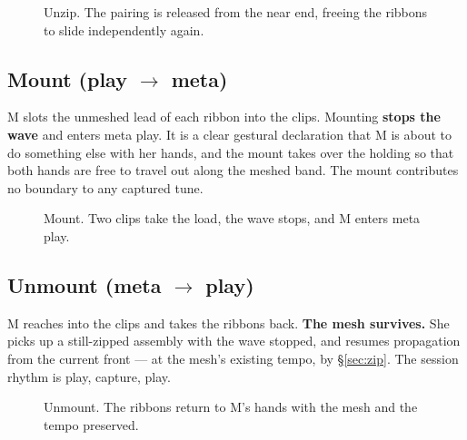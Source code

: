 \documentclass[11pt,a4paper]{article}
\theoremstyle{definition}
\theoremstyle{plain}
\theoremstyle{remark}
\newcommand{\spools}{%
  \fill[ribL,opacity=.45,rounded corners=2pt] (1.55,5.40) rectangle (2.45,5.95);
  \fill[ribR,opacity=.45,rounded corners=2pt] (5.55,5.40) rectangle (6.45,5.95);
  \node[font=\scriptsize] at (2,6.22) {left spool};
  \node[font=\scriptsize] at (6,6.22) {right spool};
}
\newcommand{\musician}{%
  \draw[gray] (4,-0.10) circle (0.23);
  \node[font=\scriptsize] at (4,-0.10) {M};
}
\newcommand{\axes}{%
  \draw[->,gray,thin] (0.85,4.30) -- (1.45,4.30) node[right,font=\scriptsize]{$x$};
  \draw[->,gray,thin] (0.85,4.30) -- (0.85,4.90) node[above,font=\scriptsize]{$z$};
}
\newcommand{\ribbonszipped}{%
  \draw[ribL,opacity=.45,line width=16pt,line join=round]
    (2,5.40) -- (2,4.60) -- (3.72,4.20) -- (3.72,2.20) -- (3.10,1.70) -- (3.10,0.70);
  \draw[ribR,opacity=.45,line width=16pt,line join=round]
    (6,5.40) -- (6,4.60) -- (4.28,4.20) -- (4.28,2.20) -- (4.90,1.70) -- (4.90,0.70);
}
\newcommand{\mesh}[2]{%
  \draw[gray!75,decorate,decoration={zigzag,segment length=5pt,amplitude=3pt}]
    (4,#1) -- (4,#2);
}
\newcommand{\mountclips}{%
  \fill[amb,opacity=.75,rounded corners=1pt] (3.76,1.05) rectangle (3.92,1.45);
  \fill[amb,opacity=.75,rounded corners=1pt] (4.08,1.05) rectangle (4.24,1.45);
}
\newcommand{\handat}[2]{\filldraw[fill=white,draw=gray!80,thin] (#1,#2) circle (0.17);}
\newcommand{\handsdefault}{\handat{3.10}{0.55}\handat{4.90}{0.55}}
\begin{document}
\begin{figure}[H]\centering
{}
\caption{Unzip. The pairing is released from the near end, freeing the ribbons to slide
independently again.}
\end{figure}

\subsection{Mount \normalfont(play $\to$ meta)}

M slots the unmeshed lead of each ribbon into the clips. Mounting \textbf{stops the wave} and
enters meta play. It is a clear gestural declaration that M is about to do something else with her
hands, and the mount takes over the holding so that both hands are free to travel out along the
meshed band. The mount contributes no boundary to any captured tune.

\begin{figure}[H]\centering
{}
\caption{Mount. Two clips take the load, the wave stops, and M enters meta play.}
\end{figure}

\subsection{Unmount \normalfont(meta $\to$ play)}

M reaches into the clips and takes the ribbons back. \textbf{The mesh survives.} She picks up a
still-zipped assembly with the wave stopped, and resumes propagation from the current front --- at
the mesh's existing tempo, by \S\ref{sec:zip}. The session rhythm is play, capture, play.

\begin{figure}[H]\centering
{}
\caption{Unmount. The ribbons return to M's hands with the mesh and the tempo preserved.}
\end{figure}
\end{document}
